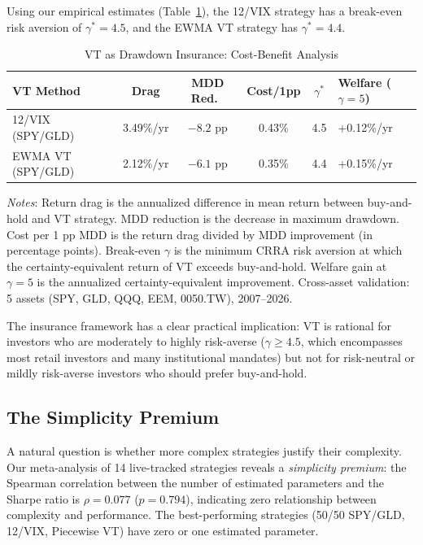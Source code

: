 \documentclass[12pt,a4paper]{article}
\begin{document}
Using our empirical estimates (Table~\ref{tab:insurance}), the 12/VIX strategy has a break-even risk aversion of $\gamma^* = 4.5$, and the EWMA VT strategy has $\gamma^* = 4.4$.

\begin{table}[H]
\centering
\small
\begin{threeparttable}
\caption{VT as Drawdown Insurance: Cost-Benefit Analysis}
\label{tab:insurance}
\begin{tabular}{@{}lccccl@{}}
\toprule
VT Method & Drag & MDD Red.\ & Cost/1pp & $\gamma^*$ & Welfare ($\gamma\!=\!5$) \\
\midrule
12/VIX (SPY/GLD) & 3.49\%/yr & $-8.2$ pp & 0.43\% & 4.5 & +0.12\%/yr \\
EWMA VT (SPY/GLD) & 2.12\%/yr & $-6.1$ pp & 0.35\% & 4.4 & +0.15\%/yr \\
\bottomrule
\end{tabular}
\begin{tablenotes}
\small
\item \textit{Notes}: Return drag is the annualized difference in mean return between buy-and-hold and VT strategy. MDD reduction is the decrease in maximum drawdown. Cost per 1 pp MDD is the return drag divided by MDD improvement (in percentage points). Break-even $\gamma$ is the minimum CRRA risk aversion at which the certainty-equivalent return of VT exceeds buy-and-hold. Welfare gain at $\gamma=5$ is the annualized certainty-equivalent improvement. Cross-asset validation: 5 assets (SPY, GLD, QQQ, EEM, 0050.TW), 2007--2026.
\end{tablenotes}
\end{threeparttable}
\end{table}

The insurance framework has a clear practical implication: VT is rational for investors who are moderately to highly risk-averse ($\gamma \geq 4.5$, which encompasses most retail investors and many institutional mandates) but not for risk-neutral or mildly risk-averse investors who should prefer buy-and-hold.

\subsection{The Simplicity Premium}

A natural question is whether more complex strategies justify their complexity. Our meta-analysis of 14 live-tracked strategies reveals a \emph{simplicity premium}: the Spearman correlation between the number of estimated parameters and the Sharpe ratio is $\rho = 0.077$ ($p = 0.794$), indicating zero relationship between complexity and performance. The best-performing strategies (50/50 SPY/GLD, 12/VIX, Piecewise VT) have zero or one estimated parameter.
\end{document}
